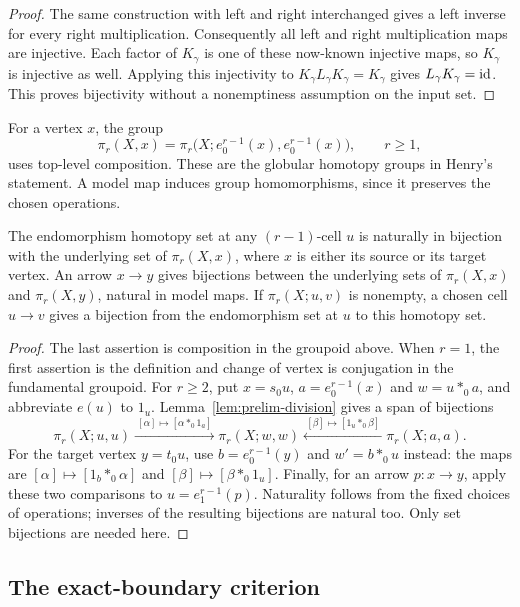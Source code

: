 \begin{proof}
The same construction with left and right interchanged gives a
left inverse for every right multiplication.  Consequently all
left and right multiplication maps are injective.  Each factor
of $K_\gamma$ is one of these now-known injective maps, so
$K_\gamma$ is injective as well.  Applying this injectivity to
$K_\gamma L_\gamma K_\gamma=K_\gamma$ gives
$L_\gamma K_\gamma=\mathrm{id}$.  This proves bijectivity without a
nonemptiness assumption on the input set.
\end{proof}

For a vertex $x$, the group
\[
 \pi_r(X,x)=
 \pi_r\bigl(X;e_0^{r-1}(x),e_0^{r-1}(x)\bigr),\qquad r\ge1,
\]
uses top-level composition.  These are the globular homotopy groups
in Henry's statement.  A model map induces group homomorphisms,
since it preserves the chosen operations.

\begin{lemma}\label{lem:prelim-boundary-change}
The endomorphism homotopy set at any $(r-1)$-cell $u$ is naturally
in bijection with the underlying set of $\pi_r(X,x)$, where $x$
is either its source or its target vertex.  An arrow $x\to y$
gives bijections between the underlying sets of $\pi_r(X,x)$
and $\pi_r(X,y)$, natural in model maps.  If
$\pi_r(X;u,v)$ is nonempty, a chosen cell $u\to v$ gives a
bijection from the endomorphism set at $u$ to this homotopy set.
\end{lemma}

\begin{proof}
The last assertion is composition in the groupoid above.  When
$r=1$, the first assertion is the definition and change of
vertex is conjugation in the fundamental groupoid.  For $r\ge2$,
put $x=s_0u$, $a=e_0^{r-1}(x)$ and $w=u*_0a$, and abbreviate
$e(u)$ to $1_u$.  Lemma~\ref{lem:prelim-division} gives a span
of bijections
\[
 \pi_r(X;u,u)
 \xrightarrow{\ [\alpha]\mapsto[\alpha*_0 1_a]\ }
 \pi_r(X;w,w)
 \xleftarrow{\ [\beta]\mapsto[1_u*_0\beta]\ }
 \pi_r(X;a,a).
\]
For the target vertex $y=t_0u$, use
$b=e_0^{r-1}(y)$ and $w'=b*_0u$ instead: the maps are
$[\alpha]\mapsto[1_b*_0\alpha]$ and
$[\beta]\mapsto[\beta*_0 1_u]$.  Finally, for an arrow
$p:x\to y$, apply these two comparisons to
$u=e_1^{r-1}(p)$.  Naturality follows from the fixed choices of
operations; inverses of the resulting bijections are natural too.
Only set bijections are needed here.
\end{proof}

\subsection{The exact-boundary criterion}

